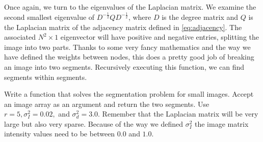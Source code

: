 Once again, we turn to the eigenvalues of the Laplacian matrix.
We examine the second smallest eigenvalue of $D^{-\frac{1}{2}}QD^{-\frac{1}{2}}$, where $D$ is the degree matrix and $Q$ is the Laplacian matrix of the adjacency matrix defined in \eqref{eq:adjacency}.
The associated $N^2 \times 1$ eigenvector will have positive and negative entries, splitting the image into two parts.
Thanks to some very fancy mathematics and the way we have defined the weights between nodes, this does a pretty good job of breaking an image into two segments.
Recursively executing this function, we can find segments within segments.


\begin{problem}  Write a function  that solves the segmentation problem for small images.
Accept an image array as an argument and return the two segments.
Use $r = 5, \sigma_I^2 = 0.02,$ and $\sigma_d^2 = 3.0$.
Remember that the Laplacian matrix will be very large but also very sparse.
Because of the way we defined $\sigma_I^2$ the image matrix intensity values need to be between $0.0$ and $1.0$.
\end{problem}
